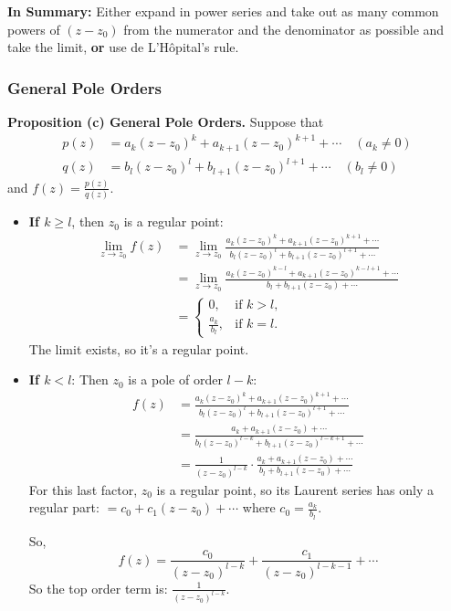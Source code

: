 \medskip
\noindent\textbf{In Summary:} Either expand in power series and take out as many common powers of $(z-z_0)$ from the numerator and the denominator as possible and take the limit, \textbf{or} use de L'Hôpital's rule.

\subsubsection{General Pole Orders}

\noindent\textbf{Proposition (c) General Pole Orders.} Suppose that 
\begin{align*}
    p(z) &= a_k(z-z_0)^k + a_{k+1}(z-z_0)^{k+1} + \cdots \quad (a_k \ne 0) \\
    q(z) &= b_l(z-z_0)^l + b_{l+1}(z-z_0)^{l+1} + \cdots \quad (b_l \ne 0)
\end{align*}
and $f(z) = \frac{p(z)}{q(z)}$.

\begin{itemize}
    \item \textbf{If $k \ge l$}, then $z_0$ is a regular point:
    \begin{align*}
        \lim_{z \to z_0} f(z) &= \lim_{z \to z_0} \frac{a_k(z-z_0)^k + a_{k+1}(z-z_0)^{k+1} + \cdots}{b_l(z-z_0)^l + b_{l+1}(z-z_0)^{l+1} + \cdots} \\
        &= \lim_{z \to z_0} \frac{a_k(z-z_0)^{k-l} + a_{k+1}(z-z_0)^{k-l+1} + \cdots}{b_l + b_{l+1}(z-z_0) + \cdots} \\
        &= \begin{cases} 
            0, & \text{if } k > l, \\ 
            \frac{a_k}{b_l}, & \text{if } k = l. 
        \end{cases}
    \end{align*}
    The limit exists, so it's a regular point.

    \item \textbf{If $k < l$}: Then $z_0$ is a pole of order $l-k$:
    \begin{align*}
        f(z) &= \frac{a_k(z-z_0)^k + a_{k+1}(z-z_0)^{k+1} + \cdots}{b_l(z-z_0)^l + b_{l+1}(z-z_0)^{l+1} + \cdots} \\
        &= \frac{a_k + a_{k+1}(z-z_0) + \cdots}{b_l(z-z_0)^{l-k} + b_{l+1}(z-z_0)^{l-k+1} + \cdots} \\
        &= \frac{1}{(z-z_0)^{l-k}} \cdot \frac{a_k + a_{k+1}(z-z_0) + \cdots}{b_l + b_{l+1}(z-z_0) + \cdots}
    \end{align*}
    For this last factor, $z_0$ is a regular point, so its Laurent series has only a regular part: $= c_0 + c_1(z-z_0) + \cdots$ where $c_0 = \frac{a_k}{b_l}$.
    
    So,
    \[
        f(z) = \frac{c_0}{(z-z_0)^{l-k}} + \frac{c_1}{(z-z_0)^{l-k-1}} + \cdots
    \]
    So the top order term is: $\frac{1}{(z-z_0)^{l-k}}$.
\end{itemize}

